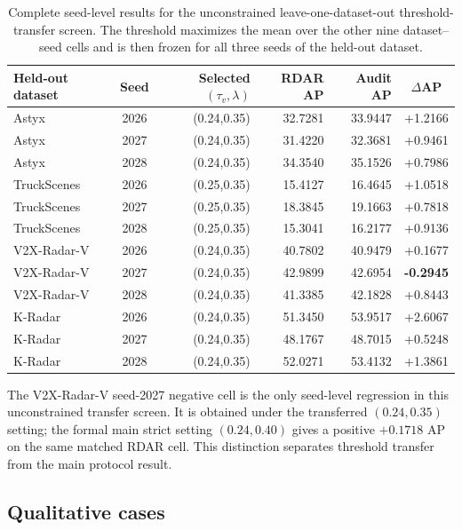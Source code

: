 \documentclass[preprint,12pt,times]{elsarticle}
\newcommand{\reviewcaption}[1]{\caption{\textcolor{floatreviewblue}{#1}}}
\newcommand{\reviewcaption}[1]{\caption{#1}}
\begin{document}
\begin{table}[!t]
\centering
\reviewcaption{Complete seed-level results for the unconstrained
leave-one-dataset-out threshold-transfer screen. The threshold maximizes the
mean over the other nine dataset--seed cells and is then frozen for all three
seeds of the held-out dataset.}
\label{tab:lodo-seed-audit}
\begingroup
\color{black}
\scriptsize
\setlength{\tabcolsep}{6pt}
\renewcommand{\arraystretch}{1.10}
\begin{tabular}{lcrrrc}
\toprule
Held-out dataset & Seed & Selected $(\tau_v,\lambda)$ & RDAR AP & Audit AP & $\Delta$AP \\
\midrule
Astyx & 2026 & (0.24,0.35) & 32.7281 & 33.9447 & +1.2166 \\
Astyx & 2027 & (0.24,0.35) & 31.4220 & 32.3681 & +0.9461 \\
Astyx & 2028 & (0.24,0.35) & 34.3540 & 35.1526 & +0.7986 \\
\addlinespace
TruckScenes & 2026 & (0.25,0.35) & 15.4127 & 16.4645 & +1.0518 \\
TruckScenes & 2027 & (0.25,0.35) & 18.3845 & 19.1663 & +0.7818 \\
TruckScenes & 2028 & (0.25,0.35) & 15.3041 & 16.2177 & +0.9136 \\
\addlinespace
V2X-Radar-V & 2026 & (0.24,0.35) & 40.7802 & 40.9479 & +0.1677 \\
V2X-Radar-V & 2027 & (0.24,0.35) & 42.9899 & 42.6954 & \textbf{-0.2945} \\
V2X-Radar-V & 2028 & (0.24,0.35) & 41.3385 & 42.1828 & +0.8443 \\
\addlinespace
K-Radar & 2026 & (0.24,0.35) & 51.3450 & 53.9517 & +2.6067 \\
K-Radar & 2027 & (0.24,0.35) & 48.1767 & 48.7015 & +0.5248 \\
K-Radar & 2028 & (0.24,0.35) & 52.0271 & 53.4132 & +1.3861 \\
\bottomrule
\end{tabular}
\endgroup
\vspace{2pt}
\parbox{\textwidth}{\scriptsize
The V2X-Radar-V seed-2027 negative cell is the only seed-level regression in
this unconstrained transfer screen. It is obtained under the transferred
$(0.24,0.35)$ setting; the formal main strict setting $(0.24,0.40)$ gives a
positive $+0.1718$ AP on the same matched RDAR cell. This distinction separates
threshold transfer from the main protocol result.}
\end{table}

\subsection{Qualitative cases}
\end{document}
